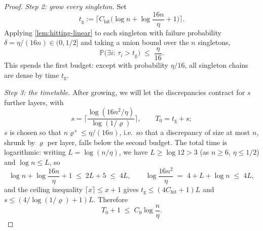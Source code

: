 \documentclass[
    aps,
    superscriptaddress,
    onecolumn,
    10pt,
    prx,
    nofootinbib
]{revtex4-2}
\theoremstyle{namedstatement}
\theoremstyle{plain}
\begin{document}
\begin{proof}
\medskip\noindent\emph{Step 2: grow every singleton.}
Set
\begin{equation}\label{eq:tg}
  t_{\mathrm g}:=\Big\lceil C_{\mathrm{hit}}\Big(\log n+\log\frac{16n}\eta+1\Big)\Big\rceil.
\end{equation}
Applying \cref{lem:hitting-linear} to each singleton with failure probability $\delta=\eta/(16n) \in (0,1/2]$ and taking a union bound over the $n$ singletons,
\begin{equation}\label{eq:growth-fail}
  \mathbb P\big(\exists i:\,\tau_i>t_{\mathrm g}\big)\;\le\;\frac\eta{16}.
\end{equation}
This spends the first budget: except with probability $\eta/16$, all singleton chains are dense by time $t_{\mathrm g}$.
 
\medskip\noindent\emph{Step 3: the timetable.}
After growing, we will let the discrepancies contract for $s$ further layers, with
\begin{equation}\label{eq:s-T0}
  s=\Bigg\lceil\frac{\log(16n^2/\eta)}{\log(1/\varrho)}\Bigg\rceil,
  \qquad
  T_0=t_{\mathrm g}+s;
\end{equation}
$s$ is chosen so that $n\varrho^{\,s}\le\eta/(16n)$, i.e.\ so that a discrepancy of size at most $n$, shrunk by $\varrho$ per layer, falls below the second budget. The total time is logarithmic: writing $L=\log(n/\eta)$, we have $L\ge\log12>3$ (as $n\ge6$, $\eta\le1/2$) and $\log n\le L$, so
\begin{equation}
  \log n+\log\frac{16n}\eta+1\;\le\;2L+5\;\le\;4L,
  \qquad
  \log\frac{16n^2}\eta\;=\;4+L+\log n\;\le\;4L,
\end{equation}
and the ceiling inequality $\lceil x\rceil\le x+1$ gives
$t_{\mathrm g}\le(4C_{\mathrm{hit}}+1)L$ and $s\le(4/\log(1/\varrho)+1)L$. Therefore
\begin{equation}\label{eq:T0-bound}
  T_0+1\;\le\;C_0\log\frac n\eta.
\end{equation}
 

\end{proof}
\end{document}
